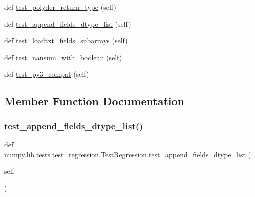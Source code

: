 \begin{DoxyCompactItemize}
\item 
def \hyperlink{classnumpy_1_1lib_1_1tests_1_1test__regression_1_1TestRegression_a27f9bda9cf75a1b40e4bf55c4c1d596e}{test\+\_\+polyder\+\_\+return\+\_\+type} (self)
\item 
def \hyperlink{classnumpy_1_1lib_1_1tests_1_1test__regression_1_1TestRegression_a86ba3a4a8562e944483adf010309a7dc}{test\+\_\+append\+\_\+fields\+\_\+dtype\+\_\+list} (self)
\item 
def \hyperlink{classnumpy_1_1lib_1_1tests_1_1test__regression_1_1TestRegression_a24744610dd49ad2f0fb0572a7fa954fc}{test\+\_\+loadtxt\+\_\+fields\+\_\+subarrays} (self)
\item 
def \hyperlink{classnumpy_1_1lib_1_1tests_1_1test__regression_1_1TestRegression_a65848f7e7c5d9b171920d4cc95c14aca}{test\+\_\+nansum\+\_\+with\+\_\+boolean} (self)
\item 
def \hyperlink{classnumpy_1_1lib_1_1tests_1_1test__regression_1_1TestRegression_aba43e7bbaf81a192364da6b075d067fd}{test\+\_\+py3\+\_\+compat} (self)
\end{DoxyCompactItemize}


\subsection{Member Function Documentation}
\mbox{\label{classnumpy_1_1lib_1_1tests_1_1test__regression_1_1TestRegression_a86ba3a4a8562e944483adf010309a7dc}} 
\subsubsection{\texorpdfstring{test\+\_\+append\+\_\+fields\+\_\+dtype\+\_\+list()}{test\_append\_fields\_dtype\_list()}}
{\footnotesize\ttfamily def numpy.\+lib.\+tests.\+test\+\_\+regression.\+Test\+Regression.\+test\+\_\+append\+\_\+fields\+\_\+dtype\+\_\+list (\begin{DoxyParamCaption}\item[{}]{self }\end{DoxyParamCaption})}

